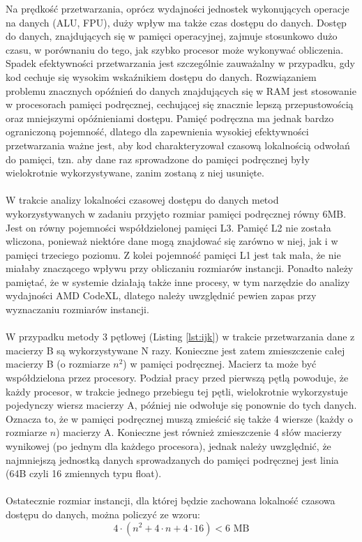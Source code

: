\documentclass[12pt,a4paper]{article}
\begin{document}
Na prędkość przetwarzania, oprócz wydajności jednostek wykonujących operacje na danych (ALU, FPU), duży wpływ ma także czas dostępu do danych. Dostęp do danych, znajdujących się w pamięci operacyjnej, zajmuje stosunkowo dużo czasu, w porównaniu do tego, jak szybko procesor może wykonywać obliczenia. Spadek efektywności przetwarzania jest szczególnie zauważalny w przypadku, gdy kod cechuje się wysokim wskaźnikiem dostępu do danych. Rozwiązaniem problemu znacznych opóźnień do danych znajdujących się w RAM jest stosowanie w procesorach pamięci podręcznej, cechującej się znacznie lepszą przepustowością oraz mniejszymi opóźnieniami dostępu. Pamięć podręczna ma jednak bardzo ograniczoną pojemność, dlatego dla zapewnienia wysokiej efektywności przetwarzania ważne jest, aby kod charakteryzował czasową lokalnością odwołań do pamięci, tzn. aby dane raz sprowadzone do pamięci podręcznej były wielokrotnie wykorzystywane, zanim zostaną z niej usunięte.\\
\\
W trakcie analizy lokalności czasowej dostępu do danych metod wykorzystywanych w zadaniu przyjęto rozmiar pamięci podręcznej równy 6MB. Jest on równy pojemności współdzielonej pamięci L3. Pamięć L2 nie została wliczona, ponieważ niektóre dane mogą znajdować się zarówno w niej, jak i w pamięci trzeciego poziomu. Z kolei pojemność pamięci L1 jest tak mała, że nie miałaby znaczącego wpływu przy obliczaniu rozmiarów instancji. Ponadto należy pamiętać, że w systemie działają także inne procesy, w tym narzędzie do analizy wydajności AMD CodeXL, dlatego należy uwzględnić pewien zapas przy wyznaczaniu rozmiarów instancji.\\
\\
W przypadku metody 3 pętlowej (Listing \ref{lst:ijk}) w trakcie przetwarzania dane z macierzy B są wykorzystywane N razy. Konieczne jest zatem zmieszczenie całej macierzy B (o rozmiarze $n^2$) w pamięci podręcznej. Macierz ta może być współdzielona przez procesory.
Podział pracy przed pierwszą pętlą powoduje, że każdy procesor, w trakcie jednego przebiegu tej pętli, wielokrotnie wykorzystuje pojedynczy wiersz macierzy A, później nie odwołuje się ponownie do tych danych. Oznacza to, że w pamięci podręcznej muszą zmieścić się także 4 wiersze (każdy o rozmiarze $n$) macierzy A.
Konieczne jest również zmieszczenie 4 słów macierzy wynikowej (po jednym dla każdego procesora), jednak należy uwzględnić, że najmniejszą jednostką danych sprowadzanych do pamięci podręcznej jest linia (64B czyli 16 zmiennych typu float).\\
\\
Ostatecznie rozmiar instancji, dla której będzie zachowana lokalność czasowa dostępu do danych, można policzyć ze wzoru:
\begin{equation}
4 \cdot \left( n^2 + 4\cdot n + 4 \cdot 16 \right) < 6 \text{ MB}
\end{equation}
\end{document}
